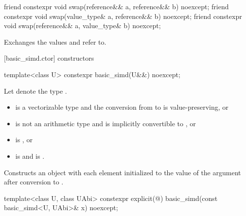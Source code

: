 \begin{itemdecl}
friend constexpr void swap(reference&& a, reference&& b) noexcept;
friend constexpr void swap(value_type& a, reference&& b) noexcept;
friend constexpr void swap(reference&& a, value_type& b) noexcept;
\end{itemdecl}

\begin{itemdescr}
  \pnum\effects
  Exchanges the values  and  refer to.
\end{itemdescr}

[basic_simd.ctor]{ constructors}

\begin{itemdecl}
template<class U> constexpr basic_simd(U&&) noexcept;
\end{itemdecl}

\begin{itemdescr}
  \pnum Let  denote the type .

  \pnum\constraints
  \begin{itemize}
    \item {} is a vectorizable type and the conversion from
       to  is value-preserving, or

    \item {} is not an arithmetic type and is implicitly convertible
      to , or

    \item {} is , or

    \item {} is  and
       is .
  \end{itemize}

  \pnum\effects
  Constructs an object with each element initialized to the value of the argument after conversion to .
\end{itemdescr}

\begin{itemdecl}
template<class U, class UAbi> constexpr explicit(@\seebelow@) basic_simd(const basic_simd<U, UAbi>& x) noexcept;
\end{itemdecl}

